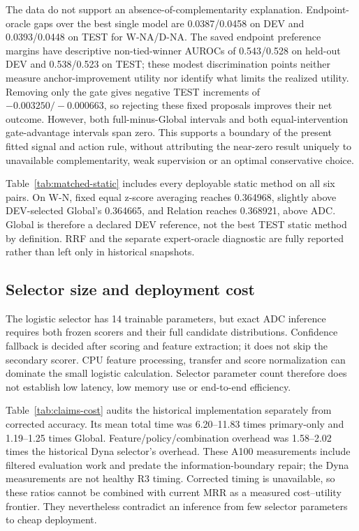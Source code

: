 \documentclass[11pt,a4paper]{article}
\begin{document}
The data do not support an absence-of-complementarity explanation. Endpoint-oracle gaps over the best single model are 0.0387/0.0458 on DEV and 0.0393/0.0448 on TEST for W-NA/D-NA. The saved endpoint preference margins have descriptive non-tied-winner AUROCs of 0.543/0.528 on held-out DEV and 0.538/0.523 on TEST; these modest discrimination points neither measure anchor-improvement utility nor identify what limits the realized utility. Removing only the gate gives negative TEST increments of $-0.003250/-0.000663$, so rejecting these fixed proposals improves their net outcome. However, both full-minus-Global intervals and both equal-intervention gate-advantage intervals span zero. This supports a boundary of the present fitted signal and action rule, without attributing the near-zero result uniquely to unavailable complementarity, weak supervision or an optimal conservative choice.

Table~\ref{tab:matched-static} includes every deployable static method on all six pairs. On W-N, fixed equal z-score averaging reaches 0.364968, slightly above DEV-selected Global's 0.364665, and Relation reaches 0.368921, above ADC. Global is therefore a declared DEV reference, not the best TEST static method by definition. RRF and the separate expert-oracle diagnostic are fully reported rather than left only in historical snapshots.


\FloatBarrier
\subsection{Selector size and deployment cost}
\label{sec:deployment-cost}
The logistic selector has 14 trainable parameters, but exact ADC inference requires both frozen scorers and their full candidate distributions. Confidence fallback is decided after scoring and feature extraction; it does not skip the secondary scorer. CPU feature processing, transfer and score normalization can dominate the small logistic calculation. Selector parameter count therefore does not establish low latency, low memory use or end-to-end efficiency.

Table~\ref{tab:claims-cost} audits the historical implementation separately from corrected accuracy. Its mean total time was 6.20--11.83 times primary-only and 1.19--1.25 times Global. Feature/policy/combination overhead was 1.58--2.02 times the historical Dyna selector's overhead. These A100 measurements include filtered evaluation work and predate the information-boundary repair; the Dyna measurements are not healthy R3 timing. Corrected timing is unavailable, so these ratios cannot be combined with current MRR as a measured cost--utility frontier. They nevertheless contradict an inference from few selector parameters to cheap deployment.
\end{document}

